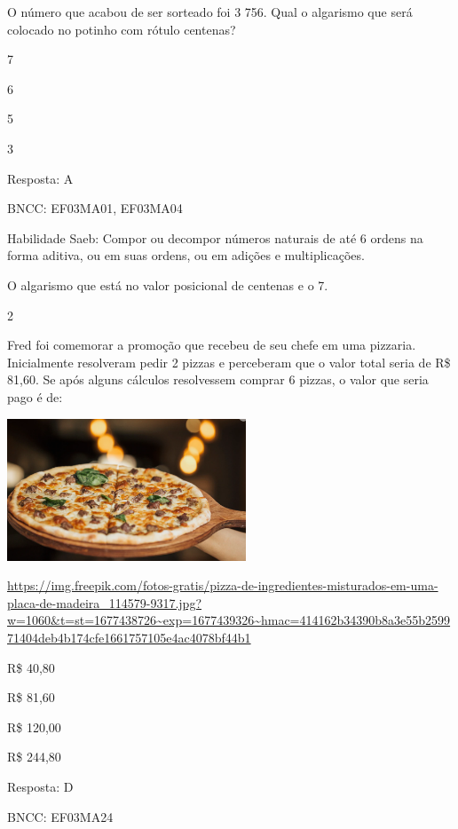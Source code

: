 \begin{escolha}
\begin{escolha}
O número que acabou de ser sorteado foi 3 756. Qual o algarismo que será
colocado no potinho com rótulo centenas?

\begin{escolha}

\item
  7
\item
  6
\item
  5
\item
  3
\end{escolha}

Resposta: A

BNCC: EF03MA01, EF03MA04

Habilidade Saeb: Compor ou decompor números naturais de até 6 ordens na
forma aditiva, ou em suas ordens, ou em adições e multiplicações.

O algarismo que está no valor posicional de centenas e o 7.

\num{2}

Fred foi comemorar a promoção que recebeu de seu chefe em uma pizzaria.
Inicialmente resolveram pedir 2 pizzas e perceberam que o valor total
seria de R\$ 81,60. Se após alguns cálculos resolvessem comprar 6
pizzas, o valor que seria pago é de:

\includegraphics[width=2.80000in,height=1.66867in]{media/image131.png}

\url{https://img.freepik.com/fotos-gratis/pizza-de-ingredientes-misturados-em-uma-placa-de-madeira_114579-9317.jpg?w=1060\&t=st=1677438726~exp=1677439326~hmac=414162b34390b8a3e55b259971404deb4b174cfe1661757105e4ac4078bf44b1}

\begin{escolha}

\item
  R\$ 40,80
\item
  R\$ 81,60
\item
  R\$ 120,00
\item
  R\$ 244,80
\end{escolha}

Resposta: D

BNCC: EF03MA24


\end{escolha}
\end{escolha}
